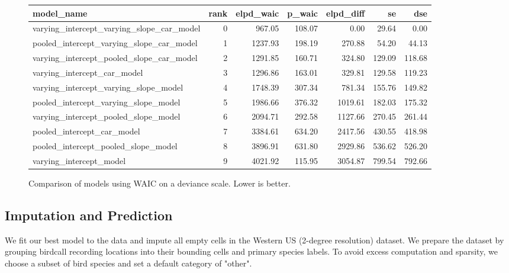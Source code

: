 \documentclass[notitlepage]{article}
\begin{document}
\begin{figure}[H]
\centering
\begin{tabular}{lrrrrrr}
\toprule
model\_name &  rank &  elpd\_waic &  p\_waic &  elpd\_diff &      se &     dse \\
\midrule
varying\_intercept\_varying\_slope\_car\_model &     0 &     967.05 &  108.07 &       0.00 &   29.64 &    0.00 \\
pooled\_intercept\_varying\_slope\_car\_model  &     1 &    1237.93 &  198.19 &     270.88 &   54.20 &   44.13 \\
varying\_intercept\_pooled\_slope\_car\_model  &     2 &    1291.85 &  160.71 &     324.80 &  129.09 &  118.68 \\
varying\_intercept\_car\_model                   &     3 &    1296.86 &  163.01 &     329.81 &  129.58 &  119.23 \\
varying\_intercept\_varying\_slope\_model     &     4 &    1748.39 &  307.34 &     781.34 &  155.76 &  149.82 \\
pooled\_intercept\_varying\_slope\_model      &     5 &    1986.66 &  376.32 &    1019.61 &  182.03 &  175.32 \\
varying\_intercept\_pooled\_slope\_model      &     6 &    2094.71 &  292.58 &    1127.66 &  270.45 &  261.44 \\
pooled\_intercept\_car\_model                    &     7 &    3384.61 &  634.20 &    2417.56 &  430.55 &  418.98 \\
pooled\_intercept\_pooled\_slope\_model       &     8 &    3896.91 &  631.80 &    2929.86 &  536.62 &  526.20 \\
varying\_intercept\_model                       &     9 &    4021.92 &  115.95 &    3054.87 &  799.54 &  792.66 \\
\bottomrule
\end{tabular}
\caption{Comparison of models using WAIC on a deviance scale. Lower is better.}
\label{table:waic_comparison}
\end{figure}

\subsection{Imputation and Prediction}

We fit our best model to the data and impute all empty cells in the Western US (2-degree resolution) dataset.
We prepare the dataset by grouping birdcall recording locations into their bounding cells and primary species labels.
To avoid excess computation and sparsity, we choose a subset of bird species and set a default category of "other".
\end{document}
